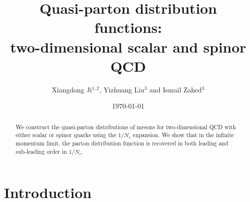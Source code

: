 \documentclass[showpacs,twocolumn,aps,preprintnumbers,letterpaper]{revtex4}
\begin{document}
\title{Quasi-parton distribution functions:\\
two-dimensional scalar and spinor QCD}



\author{Xiangdong Ji$^{1,2}$, Yizhuang Liu$^3$  and Ismail Zahed$^3$}






\date{\today}
\begin{abstract}
We construct the quasi-parton distributions of mesons for two-dimensional QCD with either scalar or spinor quarks
using the $1/N_c$ expansion. We show that in the infinite momentum limit, the parton distribution function
is recovered in both leading and sub-leading order in $1/N_c$. 



\end{abstract}



\maketitle

\setcounter{footnote}{0}



\section{Introduction}
\end{document}
